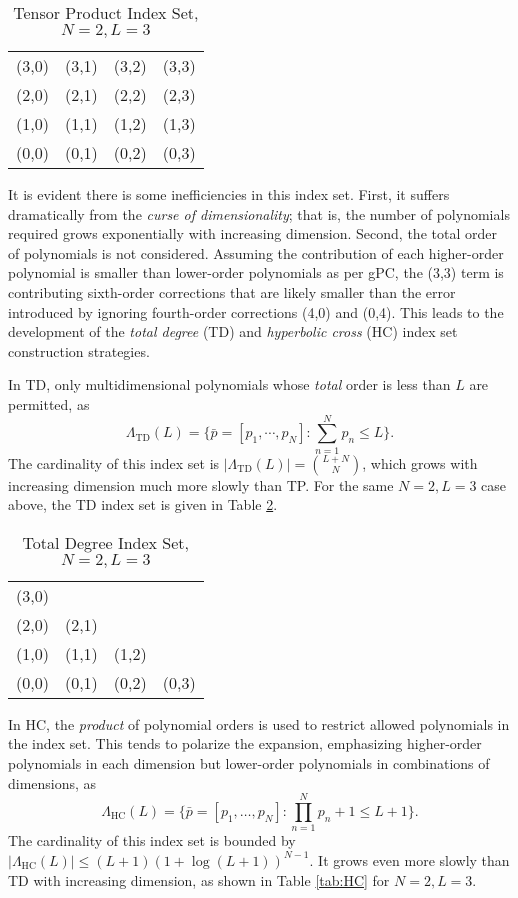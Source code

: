 \begin{table}[h]
  \centering
  \begin{tabular}{c c c c}
    (3,0) & (3,1) & (3,2) & (3,3) \\
    (2,0) & (2,1) & (2,2) & (2,3) \\
    (1,0) & (1,1) & (1,2) & (1,3) \\
    (0,0) & (0,1) & (0,2) & (0,3)
  \end{tabular}
  \caption{Tensor Product Index Set, $N=2,L=3$}
  \label{tab:TP}
\end{table}

It is evident there is some inefficiencies in this index set.  First, it suffers dramatically from the
\emph{curse of dimensionality}; that is, the number of polynomials required grows exponentially with
increasing dimension.  Second, the total order of polynomials is not considered.  Assuming the contribution of
each higher-order polynomial is smaller than lower-order polynomials as per gPC, the (3,3) term is
contributing sixth-order corrections that are likely smaller than the error introduced by ignoring
fourth-order corrections (4,0) and (0,4).  This leads to the development of the \emph{total degree} (TD) and
\emph{hyperbolic cross} (HC) index set construction strategies\cite{hctd}.

In TD, only multidimensional polynomials whose \emph{total} order is less than $L$ are permitted, as
\begin{equation}
  \Lambda_\text{TD}(L)=\Big\{\bar p=[p_1,\cdots,p_N]:\sum_{n=1}^N p_n \leq L
\Big\}.
\end{equation}
The cardinality of this index set is $|\Lambda_\text{TD}(L)|={L+N\choose N}$, which grows with increasing
dimension much more slowly than TP.  For the same $N=2,L=3$ case above, the TD index set is given in Table
\ref{tab:TD}. 

\begin{table}[h]
  \centering
  \begin{tabular}{c c c c}
    (3,0) &       &       &       \\
    (2,0) & (2,1) &       &       \\
    (1,0) & (1,1) & (1,2) &       \\
    (0,0) & (0,1) & (0,2) & (0,3)
  \end{tabular}
  \caption{Total Degree Index Set, $N=2,L=3$}
  \label{tab:TD}
\end{table}

In HC, the \emph{product} of polynomial orders is used to restrict allowed polynomials in the index set.  This
tends to polarize the expansion, emphasizing higher-order polynomials in each dimension but lower-order
polynomials in combinations of dimensions, as
\begin{equation}
  \Lambda_\text{HC}(L)=\Big\{\bar p=[p_1,\ldots,p_N]:\prod_{n=1}^N p_n+1 \leq L+1
\Big\}.
\end{equation}
The cardinality of this index set is bounded by $|\Lambda_\text{HC}(L)|\leq (L+1)(1+\log(L+1))^{N-1}$. It
grows even more slowly than TD with increasing dimension, as shown in Table \ref{tab:HC} for $N=2,L=3$.

